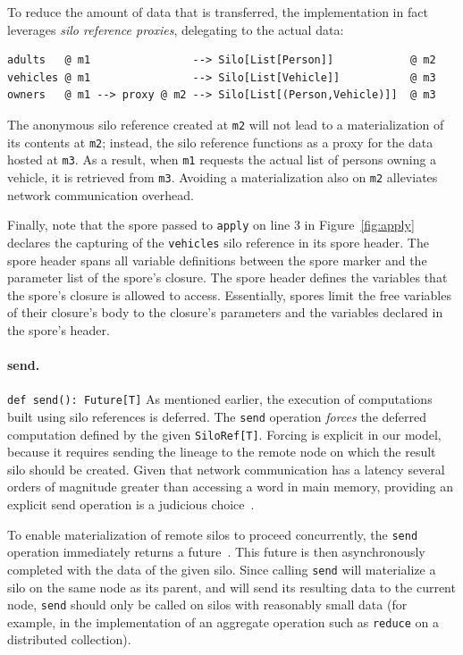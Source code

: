 \documentclass{jfp1}
\begin{document}
To reduce the amount of data that is transferred, the implementation in fact
leverages {\em silo reference proxies}, delegating to the actual data:

\begin{lstlisting}
adults   @ m1                --> Silo[List[Person]]            @ m2
vehicles @ m1                --> Silo[List[Vehicle]]           @ m3
owners   @ m1 --> proxy @ m2 --> Silo[List[(Person,Vehicle)]]  @ m3
\end{lstlisting}
\noindent
The anonymous silo reference created at \verb|m2| will not lead to a
materialization of its contents at \verb|m2|; instead, the silo
reference functions as a proxy for the data hosted at \verb|m3|.  As a
result, when \verb|m1| requests the actual list of persons owning a
vehicle, it is retrieved from \verb|m3|. Avoiding a materialization
also on \verb|m2| alleviates network communication overhead.

Finally, note that the spore passed to \verb|apply| on line 3 in Figure~\ref{fig:apply} declares the
capturing of the \verb|vehicles| silo reference in its spore
header. The spore header spans all variable definitions between the
spore marker and the parameter list of the spore's closure. The spore
header defines the variables that the spore's closure is allowed to
access. Essentially, spores limit the free variables of their
closure's body to the closure's parameters and the variables declared
in the spore's header.

\paragraph{send.}%
%
\texttt{def send(): Future[T]} \newline
%
As mentioned earlier, the execution of computations built using silo references
is deferred. The \verb|send| operation {\em forces} the deferred computation
defined by the given \verb|SiloRef[T]|. Forcing is explicit in our model, because it
requires sending the lineage to the remote node on which the result silo should
be created. Given that network communication has a latency several orders of
magnitude greater than accessing a word in main memory, providing an explicit
send operation is a judicious choice~\cite{ANoteDistComp}.

To enable materialization of remote silos to proceed concurrently, the
\verb|send| operation immediately returns a future~\cite{Futures}. This future
is then asynchronously completed with the data of the given silo. Since calling
\verb|send| will materialize a silo on the same node as its parent, and will send
its resulting data to the current node,
\verb|send| should only be called on silos with reasonably small data (for
example, in the implementation of an aggregate operation such as \verb|reduce|
on a distributed collection).
\end{document}

